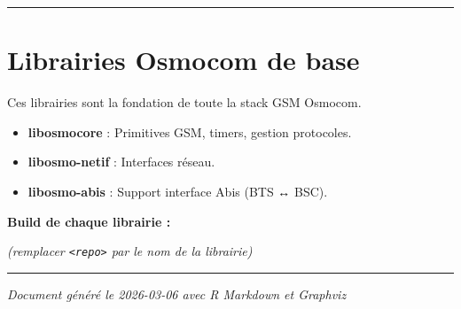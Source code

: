 \documentclass[
]{article}
\newenvironment{Shaded}{\begin{snugshade}}{\end{snugshade}}
\newcommand{\AttributeTok}[1]{\textcolor[rgb]{0.13,0.29,0.53}{#1}}
\newcommand{\BuiltInTok}[1]{#1}
\newcommand{\ExtensionTok}[1]{#1}
\newcommand{\FunctionTok}[1]{\textcolor[rgb]{0.13,0.29,0.53}{\textbf{#1}}}
\newcommand{\KeywordTok}[1]{\textcolor[rgb]{0.13,0.29,0.53}{\textbf{#1}}}
\newcommand{\NormalTok}[1]{#1}
\newcommand{\OperatorTok}[1]{\textcolor[rgb]{0.81,0.36,0.00}{\textbf{#1}}}
\newcommand{\VariableTok}[1]{\textcolor[rgb]{0.00,0.00,0.00}{#1}}
\providecommand{\tightlist}{%
  \setlength{\itemsep}{0pt}\setlength{\parskip}{0pt}}
\begin{document}
\begin{center}\rule{0.5\linewidth}{0.5pt}\end{center}

\section{Librairies Osmocom de base}\label{librairies-osmocom-de-base}

Ces librairies sont la fondation de toute la stack GSM Osmocom.

\begin{itemize}
\tightlist
\item
  \textbf{libosmocore} : Primitives GSM, timers, gestion protocoles.
\item
  \textbf{libosmo-netif} : Interfaces réseau.
\item
  \textbf{libosmo-abis} : Support interface Abis (BTS ↔ BSC).
\end{itemize}

\textbf{Build de chaque librairie :}

\begin{Shaded}
\end{Shaded}

\emph{(remplacer \texttt{\textless{}repo\textgreater{}} par le nom de la
librairie)}

\begin{center}\rule{0.5\linewidth}{0.5pt}\end{center}

\emph{Document généré le 2026-03-06 avec R Markdown et Graphviz}
\end{document}
